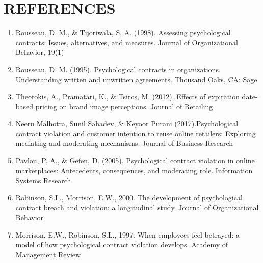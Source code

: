\documentclass[a4paper, 12pt]{extarticle}
\begin{document}
{\section{REFERENCES}
\begin{enumerate}
\item Rousseau, D. M., \& Tijoriwala, S. A. (1998). Assessing psychological contracts: Issues, alternatives, and measures. Journal of Organizational Behavior, 19(1)%
\item Rousseau, D. M. (1995). Psychological contracts in organizations. Understanding written and unwritten agreements. Thousand Oaks, CA: Sage
\item Theotokis, A., Pramatari, K., \& Tsiros, M. (2012). Effects of expiration date-based pricing on brand image perceptions. Journal of Retailing%
\item Neeru Malhotra, Sunil Sahadev, \& Keyoor Purani (2017).Psychological contract violation and customer intention to reuse online retailers: Exploring mediating and moderating mechanisms. Journal of Business Research%
\item Pavlou, P. A., \& Gefen, D. (2005). Psychological contract violation in online marketplaces: Antecedents, consequences, and moderating role. Information Systems Research%
\item Robinson, S.L., Morrison, E.W., 2000. The development of psychological contract breach and violation: a longitudinal study. Journal of Organizational Behavior %
\item Morrison, E.W., Robinson, S.L., 1997. When employees feel betrayed: a model of how psychological contract violation develops. Academy of Management Review%

\end{enumerate}}
\end{document}
